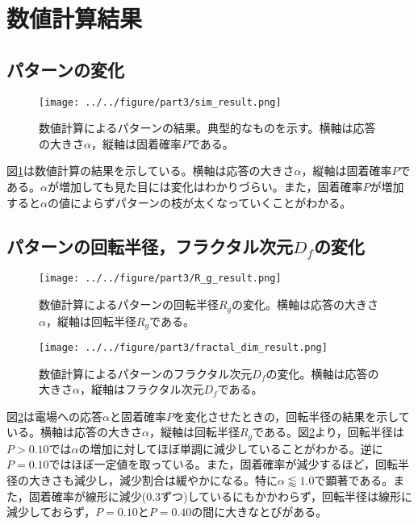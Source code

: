 \documentclass[autodetect-engine,dvi=dvipdfmx,a4paper,ja=standard,oneside,openany,11pt,draft]{bxjsbook}
\begin{document}
\section{数値計算結果}
\subsection{パターンの変化}

\begin{figure}[htbp]
  \centering
  \texttt{[image: ../../figure/part3/sim\_result.png]}
  \caption{数値計算によるパターンの結果。典型的なものを示す。横軸は応答の大きさ$\alpha$，縦軸は固着確率$P$である。}
  \label{fig:sim_result}
\end{figure}

図\ref{fig:sim_result}は数値計算の結果を示している。横軸は応答の大きさ$\alpha$，縦軸は固着確率$P$である。$\alpha$が増加しても見た目には変化はわかりづらい。また，固着確率$P$が増加すると$\alpha$の値によらずパターンの枝が太くなっていくことがわかる。
\subsection{パターンの回転半径，フラクタル次元$D_f$の変化}

\begin{figure}[htbp]
  \centering
  \texttt{[image: ../../figure/part3/R\_g\_result.png]}
  \caption{数値計算によるパターンの回転半径$R_g$の変化。横軸は応答の大きさ$\alpha$，縦軸は回転半径$R_g$である。}
  \label{fig:R_g_result}
\end{figure}

\begin{figure}
  \centering
  \texttt{[image: ../../figure/part3/fractal\_dim\_result.png]}
  \caption{数値計算によるパターンのフラクタル次元$D_f$の変化。横軸は応答の大きさ$\alpha$，縦軸はフラクタル次元$D_f$である。}
  \label{fig:fractal_dim_result}
\end{figure}

図\ref{fig:R_g_result}は電場への応答$\alpha$と固着確率$P$を変化させたときの，回転半径の結果を示している。横軸は応答の大きさ$\alpha$，縦軸は回転半径$R_g$である。図\ref{fig:R_g_result}より，回転半径は$P>0.10$では$\alpha$の増加に対してほぼ単調に減少していることがわかる。逆に$P=0.10$ではほぼ一定値を取っている。また，固着確率が減少するほど，回転半径の大きさも減少し，減少割合は緩やかになる。特に$\alpha\lessapprox1.0$で顕著である。また，固着確率が線形に減少(0.3ずつ)しているにもかかわらず，回転半径は線形に減少しておらず，$P=0.10$と$P=0.40$の間に大きなとびがある。
\end{document}
